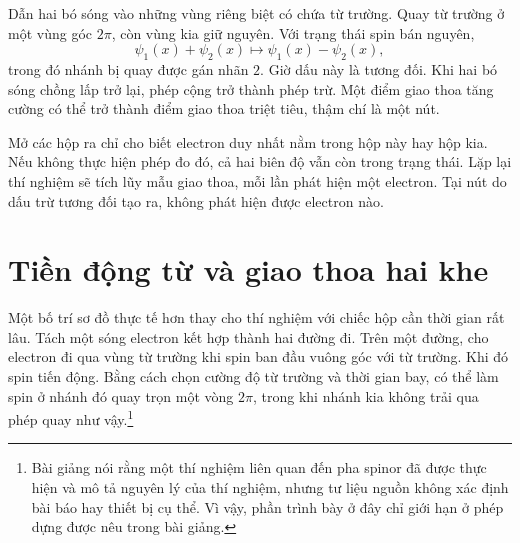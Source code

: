 Dẫn hai bó sóng vào những vùng riêng biệt có chứa từ trường. Quay từ trường ở một vùng góc \(2\pi\), còn vùng kia giữ nguyên. Với trạng thái spin bán nguyên,
\begin{equation}
\psi_1(x)+\psi_2(x)
\longmapsto
\psi_1(x)-\psi_2(x),
\end{equation}
trong đó nhánh bị quay được gán nhãn \(2\). Giờ dấu này là tương đối. Khi hai bó sóng chồng lấp trở lại, phép cộng trở thành phép trừ. Một điểm giao thoa tăng cường có thể trở thành điểm giao thoa triệt tiêu, thậm chí là một nút.

\begin{classroomqa}
\end{classroomqa}

Mở các hộp ra chỉ cho biết electron duy nhất nằm trong hộp này hay hộp kia. Nếu không thực hiện phép đo đó, cả hai biên độ vẫn còn trong trạng thái. Lặp lại thí nghiệm sẽ tích lũy mẫu giao thoa, mỗi lần phát hiện một electron. Tại nút do dấu trừ tương đối tạo ra, không phát hiện được electron nào.

\section{Tiền động từ và giao thoa hai khe}

Một bố trí sơ đồ thực tế hơn thay cho thí nghiệm với chiếc hộp cần thời gian rất lâu. Tách một sóng electron kết hợp thành hai đường đi. Trên một đường, cho electron đi qua vùng từ trường khi spin ban đầu vuông góc với từ trường. Khi đó spin tiến động. Bằng cách chọn cường độ từ trường và thời gian bay, có thể làm spin ở nhánh đó quay trọn một vòng \(2\pi\), trong khi nhánh kia không trải qua phép quay như vậy.\footnote{Bài giảng nói rằng một thí nghiệm liên quan đến pha spinor đã được thực hiện và mô tả nguyên lý của thí nghiệm, nhưng tư liệu nguồn không xác định bài báo hay thiết bị cụ thể. Vì vậy, phần trình bày ở đây chỉ giới hạn ở phép dựng được nêu trong bài giảng.}

\begin{classroomqa}
\end{classroomqa}

